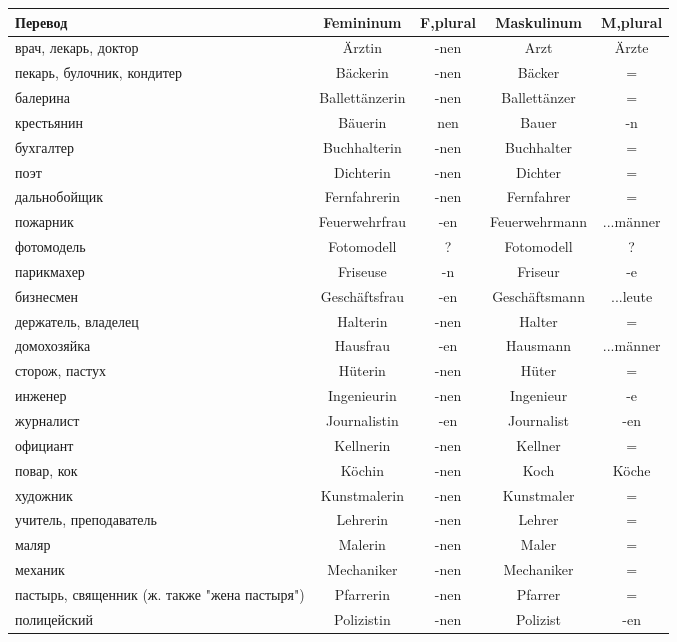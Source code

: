 

\begin{longtable}{|p{4cm}|c|c|c|c|}
\hline
Перевод & Femininum & F,plural & Maskulinum & M,plural \\
\hline\endhead

 врач, лекарь, доктор & \"Arztin & -nen & Arzt & \"Arzte \\
 пекарь, булочник, кондитер & B\"ackerin & -nen & B\"acker & = \\
 балерина & Ballett\"anzerin & -nen & Ballett\"anzer & = \\
 крестьянин & B\"auerin & nen & Bauer & -n \\
 бухгалтер & Buchhalterin & -nen & Buchhalter & = \\
 поэт & Dichterin & -nen & Dichter & = \\
 дальнобойщик & Fernfahrerin & -nen & Fernfahrer & = \\
 пожарник & Feuerwehrfrau & -en & Feuerwehrmann & ...m\"anner \\
 фотомодель & Fotomodell & ? & Fotomodell & ? \\
 парикмахер & Friseuse & -n & Friseur & -e \\
 бизнесмен & Gesch\"aftsfrau & -en & Gesch\"aftsmann & ...leute \\
 держатель, владелец & Halterin & -nen & Halter & = \\
 домохозяйка & Hausfrau & -en & Hausmann & ...m\"anner \\
 сторож, пастух & H\"uterin & -nen & H\"uter & = \\
 инженер & Ingenieurin & -nen & Ingenieur & -e \\
 журналист & Journalistin & -en & Journalist & -en \\
 официант & Kellnerin & -nen & Kellner & = \\
 повар, кок & K\"ochin & -nen & Koch & K\"oche \\
 художник & Kunstmalerin & -nen & Kunstmaler & = \\
 учитель, преподаватель & Lehrerin & -nen & Lehrer & = \\
 маляр & Malerin & -nen & Maler & = \\
 механик & Mechaniker & -nen & Mechaniker & = \\
 пастырь, священник (ж. также "жена пастыря") & Pfarrerin & -nen & Pfarrer & = \\
 полицейский & Polizistin & -nen & Polizist & -en \\

\end{longtable}
